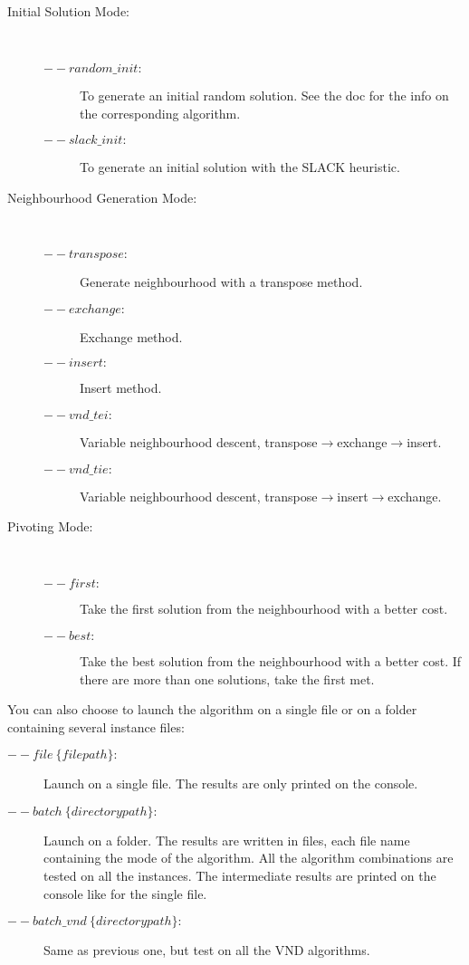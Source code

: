 \begin{description}
	\item[Initial Solution Mode:]~
		\begin{description}
		\item[$--random\_init:$] To generate an initial random solution. See the doc for the info on the corresponding algorithm.
		\item[$--slack\_init:$] To generate an initial solution with the SLACK heuristic.
		\end{description}
		
	\item[Neighbourhood Generation Mode:]~
		\begin{description}
		\item[$--transpose:$] Generate neighbourhood with a transpose method.
		\item[$--exchange:$] Exchange method.
		\item[$--insert:$] Insert method.
		\item[$--vnd\_tei:$] Variable neighbourhood descent, transpose$\rightarrow$exchange$\rightarrow$insert.
		\item[$--vnd\_tie:$] Variable neighbourhood descent, transpose$\rightarrow$insert$\rightarrow$exchange.
		\end{description}
		
	\item[Pivoting Mode:]~
		\begin{description}
		\item[$--first:$] Take the first solution from the neighbourhood with a better cost.
		\item[$--best:$] Take the best solution from the neighbourhood with a better cost. If there are more than one solutions, take the first met.
		\end{description}
		
\end{description}

You can also choose to launch the algorithm on a single file or on a folder containing several instance files:
\begin{description}
	\item[$--file ~\{filepath\}:$] Launch on a single file. The results are only printed on the console.
	\item[$--batch ~\{directory path\}:$] Launch on a folder. The results are written in files, each file name containing the mode of the algorithm. All the algorithm combinations are tested on all the instances. The intermediate results are printed on the console like for the single file.
	\item[$--batch\_vnd ~\{directory path\}:$] Same as previous one, but test on all the VND algorithms.
\end{description}

